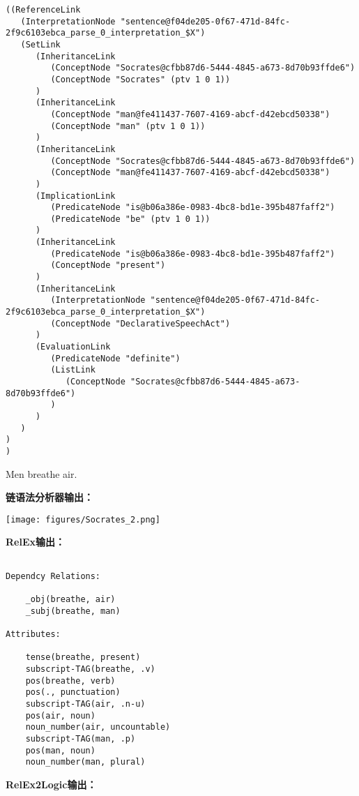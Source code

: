  {\tt\begin{small}\begin{lstlisting}
((ReferenceLink
   (InterpretationNode "sentence@f04de205-0f67-471d-84fc-2f9c6103ebca_parse_0_interpretation_$X")
   (SetLink
      (InheritanceLink
         (ConceptNode "Socrates@cfbb87d6-5444-4845-a673-8d70b93ffde6")
         (ConceptNode "Socrates" (ptv 1 0 1))
      )
      (InheritanceLink
         (ConceptNode "man@fe411437-7607-4169-abcf-d42ebcd50338")
         (ConceptNode "man" (ptv 1 0 1))
      )
      (InheritanceLink
         (ConceptNode "Socrates@cfbb87d6-5444-4845-a673-8d70b93ffde6")
         (ConceptNode "man@fe411437-7607-4169-abcf-d42ebcd50338")
      )
      (ImplicationLink
         (PredicateNode "is@b06a386e-0983-4bc8-bd1e-395b487faff2")
         (PredicateNode "be" (ptv 1 0 1))
      )
      (InheritanceLink
         (PredicateNode "is@b06a386e-0983-4bc8-bd1e-395b487faff2")
         (ConceptNode "present")
      )
      (InheritanceLink
         (InterpretationNode "sentence@f04de205-0f67-471d-84fc-2f9c6103ebca_parse_0_interpretation_$X")
         (ConceptNode "DeclarativeSpeechAct")
      )
      (EvaluationLink
         (PredicateNode "definite")
         (ListLink
            (ConceptNode "Socrates@cfbb87d6-5444-4845-a673-8d70b93ffde6")
         )
      )
   )
)
)
\end{lstlisting}\end{small}}


 Men breathe air.

{\bf 链语法分析器输出：}

\texttt{[image: figures/Socrates\_2.png]}


{\bf RelEx输出：}

\begin{verbatim}

Dependcy Relations:

    _obj(breathe, air)
    _subj(breathe, man)

Attributes:

    tense(breathe, present)
    subscript-TAG(breathe, .v)
    pos(breathe, verb)
    pos(., punctuation)
    subscript-TAG(air, .n-u)
    pos(air, noun)
    noun_number(air, uncountable)
    subscript-TAG(man, .p)
    pos(man, noun)
    noun_number(man, plural)

\end{verbatim}

{\bf RelEx2Logic输出：}

